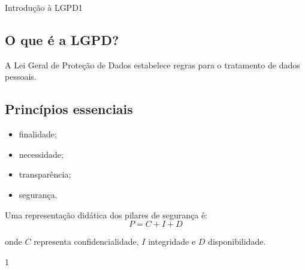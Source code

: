 \documentclass{article}
\begin{document}
\begin{altitudemodulo}{Introdução à LGPD}{1}

\begin{conteudo}
\section{O que é a LGPD?}

A Lei Geral de Proteção de Dados estabelece regras para o tratamento de dados pessoais.

\subsection{Princípios essenciais}

\begin{itemize}
  \item finalidade;
  \item necessidade;
  \item transparência;
  \item segurança.
\end{itemize}

Uma representação didática dos pilares de segurança é:
\[
P = C + I + D
\]

onde $C$ representa confidencialidade, $I$ integridade e $D$ disponibilidade.
\end{conteudo}

\begin{altitudequestao}{1}
\end{altitudequestao}

\end{altitudemodulo}
\end{document}
